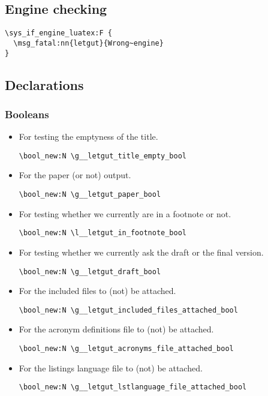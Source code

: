 \documentclass{letgut}
\begin{document}
\subsection{Engine checking}
\label{ImplementationEnginechecking-lz7g55h0jlj0}
\begin{lstlisting}
\sys_if_engine_luatex:F {
  \msg_fatal:nn{letgut}{Wrong~engine}
}
\end{lstlisting}

\subsection{Declarations}
\label{ImplementationDeclarations-3j8g55h0jlj0}
\subsubsection{Booleans}
\label{ImplementationDeclarationsBooleans-s09g55h0jlj0}
\begin{itemize}
\item For testing the emptyness of the title.
\begin{lstlisting}
\bool_new:N \g__letgut_title_empty_bool
\end{lstlisting}
\item For the paper (or not) output.
\begin{lstlisting}
\bool_new:N \g__letgut_paper_bool
\end{lstlisting}
\item For testing whether we currently are in a footnote or not.
\begin{lstlisting}
\bool_new:N \l__letgut_in_footnote_bool
\end{lstlisting}
\item For testing whether we currently ask the draft or the final version.
\begin{lstlisting}
\bool_new:N \g__letgut_draft_bool
\end{lstlisting}
\item For the included files to (not) be attached.
\begin{lstlisting}
\bool_new:N \g__letgut_included_files_attached_bool
\end{lstlisting}
\item For the acronym definitions file to (not) be attached.
\begin{lstlisting}
\bool_new:N \g__letgut_acronyms_file_attached_bool
\end{lstlisting}
\item For the listings language file to (not) be attached.
\begin{lstlisting}
\bool_new:N \g__letgut_lstlanguage_file_attached_bool
\end{lstlisting}
\end{itemize}
\end{document}
